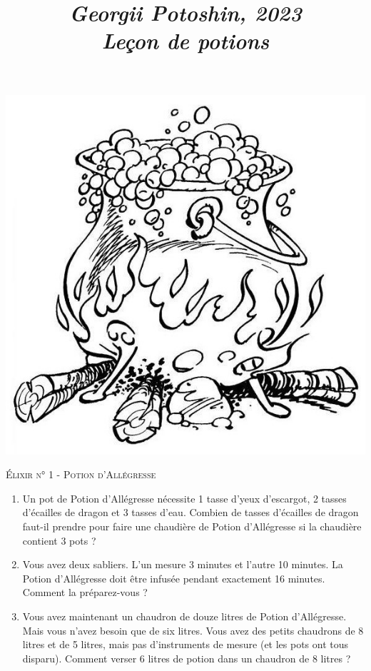 \documentclass{article}
\title{
\textit{\small{Georgii Potoshin, 2023}}\\
\vspace{0.3ex}
\textit{\huge{Leçon de potions}}\vspace{1ex}
}
\date{\vspace{-8ex}}
\begin{document}
\maketitle
\begin{center}
\includegraphics[scale=0.5]{cotel.jpeg}
\end{center}
\begin{center}\textsc{\Large{Élixir n° 1 - Potion d'Allégresse}}\end{center}
\begin{enumerate}
    \item
		Un pot de Potion d'Allégresse nécessite 1 tasse d'yeux d'escargot, 2
		tasses d'écailles de dragon et 3 tasses d'eau. Combien de tasses
		d'écailles de dragon faut-il prendre pour faire une chaudière de Potion
		d'Allégresse si la chaudière contient 3 pots ?
	\item
		Vous avez deux sabliers. L'un mesure 3 minutes et l'autre 10 minutes.
		La Potion d'Allégresse doit être infusée pendant exactement 16 minutes. 
		Comment la préparez-vous ?
	\item
		Vous avez maintenant un chaudron de douze litres de Potion d'Allégresse.
		Mais vous n'avez besoin que de six litres. Vous avez des petits
		chaudrons de 8 litres et de 5 litres, mais pas d'instruments 
		de mesure (et les pots ont tous disparu). Comment verser 6 litres de 
		potion dans un chaudron de 8 litres ?
\end{enumerate}
\end{document}
